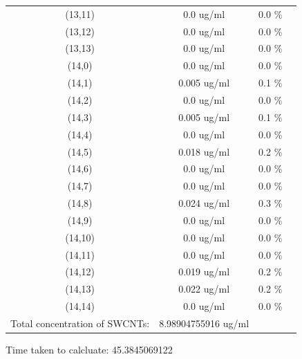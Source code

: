 \documentclass{article}
\begin{document}
\begin{tabular}{c c c c}
(13,11)&        0.0 ug/ml        &0.0 \%\\
(13,12)&        0.0 ug/ml        &0.0 \%\\
(13,13)&        0.0 ug/ml        &0.0 \%\\
(14,0)&        0.0 ug/ml        &0.0 \%\\
(14,1)&        0.005 ug/ml        &0.1 \%\\
(14,2)&        0.0 ug/ml        &0.0 \%\\
(14,3)&        0.005 ug/ml        &0.1 \%\\
(14,4)&        0.0 ug/ml        &0.0 \%\\
(14,5)&        0.018 ug/ml        &0.2 \%\\
(14,6)&        0.0 ug/ml        &0.0 \%\\
(14,7)&        0.0 ug/ml        &0.0 \%\\
(14,8)&        0.024 ug/ml        &0.3 \%\\
(14,9)&        0.0 ug/ml        &0.0 \%\\
(14,10)&        0.0 ug/ml        &0.0 \%\\
(14,11)&        0.0 ug/ml        &0.0 \%\\
(14,12)&        0.019 ug/ml        &0.2 \%\\
(14,13)&        0.022 ug/ml        &0.2 \%\\
(14,14)&        0.0 ug/ml        &0.0 \%\\
Total concentration of SWCNTs: &8.98904755916 ug/ml\\

\end{tabular}Time taken to calcluate: 45.3845069122
\end{document}
